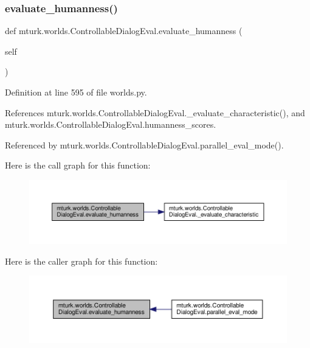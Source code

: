 \subsubsection{\texorpdfstring{evaluate\+\_\+humanness()}{evaluate\_humanness()}}
{\footnotesize\ttfamily def mturk.\+worlds.\+Controllable\+Dialog\+Eval.\+evaluate\+\_\+humanness (\begin{DoxyParamCaption}\item[{}]{self }\end{DoxyParamCaption})}



Definition at line 595 of file worlds.\+py.



References mturk.\+worlds.\+Controllable\+Dialog\+Eval.\+\_\+evaluate\+\_\+characteristic(), and mturk.\+worlds.\+Controllable\+Dialog\+Eval.\+humanness\+\_\+scores.



Referenced by mturk.\+worlds.\+Controllable\+Dialog\+Eval.\+parallel\+\_\+eval\+\_\+mode().

Here is the call graph for this function\+:
\nopagebreak
\begin{figure}[H]
\begin{center}
\leavevmode
\includegraphics[width=350pt]{classmturk_1_1worlds_1_1ControllableDialogEval_a0c80a0ddf95145c0a632c07ff7bbe99e_cgraph}
\end{center}
\end{figure}
Here is the caller graph for this function\+:
\nopagebreak
\begin{figure}[H]
\begin{center}
\leavevmode
\includegraphics[width=350pt]{classmturk_1_1worlds_1_1ControllableDialogEval_a0c80a0ddf95145c0a632c07ff7bbe99e_icgraph}
\end{center}
\end{figure}
\mbox{\label{classmturk_1_1worlds_1_1ControllableDialogEval_ae97a45f37f7e71c42ddbf152b4af0861}} 
